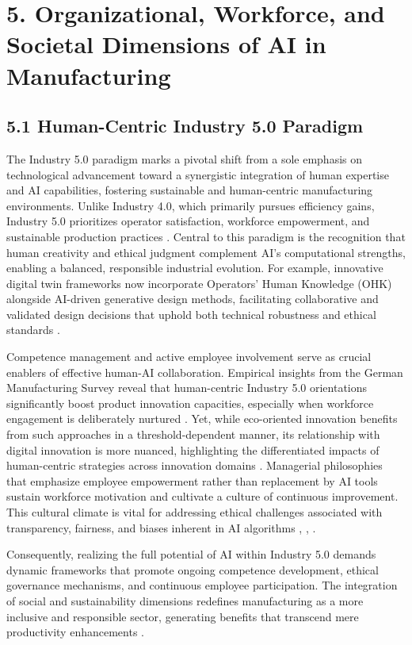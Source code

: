 \documentclass[11pt]{article}
\begin{document}
\section{5. Organizational, Workforce, and Societal Dimensions of AI in Manufacturing}

\subsection{5.1 Human-Centric Industry 5.0 Paradigm}

The Industry 5.0 paradigm marks a pivotal shift from a sole emphasis on technological advancement toward a synergistic integration of human expertise and AI capabilities, fostering sustainable and human-centric manufacturing environments. Unlike Industry 4.0, which primarily pursues efficiency gains, Industry 5.0 prioritizes operator satisfaction, workforce empowerment, and sustainable production practices \cite{ref2}. Central to this paradigm is the recognition that human creativity and ethical judgment complement AI’s computational strengths, enabling a balanced, responsible industrial evolution. For example, innovative digital twin frameworks now incorporate Operators’ Human Knowledge (OHK) alongside AI-driven generative design methods, facilitating collaborative and validated design decisions that uphold both technical robustness and ethical standards \cite{ref14}.

Competence management and active employee involvement serve as crucial enablers of effective human-AI collaboration. Empirical insights from the German Manufacturing Survey reveal that human-centric Industry 5.0 orientations significantly boost product innovation capacities, especially when workforce engagement is deliberately nurtured \cite{ref6}. Yet, while eco-oriented innovation benefits from such approaches in a threshold-dependent manner, its relationship with digital innovation is more nuanced, highlighting the differentiated impacts of human-centric strategies across innovation domains \cite{ref7}. Managerial philosophies that emphasize employee empowerment rather than replacement by AI tools sustain workforce motivation and cultivate a culture of continuous improvement. This cultural climate is vital for addressing ethical challenges associated with transparency, fairness, and biases inherent in AI algorithms \cite{ref9}, \cite{ref15}, \cite{ref36}.

Consequently, realizing the full potential of AI within Industry 5.0 demands dynamic frameworks that promote ongoing competence development, ethical governance mechanisms, and continuous employee participation. The integration of social and sustainability dimensions redefines manufacturing as a more inclusive and responsible sector, generating benefits that transcend mere productivity enhancements \cite{ref38}.
\end{document}
